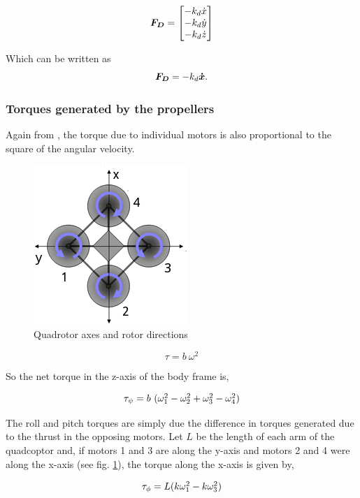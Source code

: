 \documentclass[12pt,fleqn]{article}
\newcommand{\mbm}[1]{\mbox{\boldmath $#1$}}
\begin{document}
$$ \mbm{F_D} = \begin{bmatrix} -k_d\dot{x}\\ -k_d\dot{y}\\
  -k_d\dot{z} \end{bmatrix} $$

Which can be written as 
\begin{equation} \label{dragforce}
$$ \mbm{F_D}= -k_d\mbm{\dot{x}}$$.
\end{equation}

\subsubsection{Torques generated by the propellers}

Again from \cite{Andrew}, the torque due to individual motors is also
proportional to the square of the angular velocity.

\begin{figure}
\centering
\includegraphics[scale=0.8]{quadrotor.png}
\caption{Quadrotor axes and rotor directions}
\label{quadrotor}
\end{figure}

$$ \tau = b\ \omega^2 $$

So the net torque in the z-axis of the body frame is,

\begin{equation} \label{taupsi}
$$ \tau_\psi = b\ (\omega_1^2 - \omega_2^2 + \omega_3^2 -
\omega_4^2) $$
\end{equation}

The roll and pitch torques are simply due the difference in torques
generated due to the thrust in the opposing motors. Let $L$ be the
length of each arm of the quadcoptor and, if motors 1 and 3 are along
the y-axis and motors 2 and 4 were along the x-axis (see
fig. \ref{quadrotor}), the torque along the x-axis is given by,

\begin{equation} \label{tauphi}
$$ \tau_\phi = L (k\omega_1^2 - k\omega_3^2) $$
\end{equation}
\end{document}
